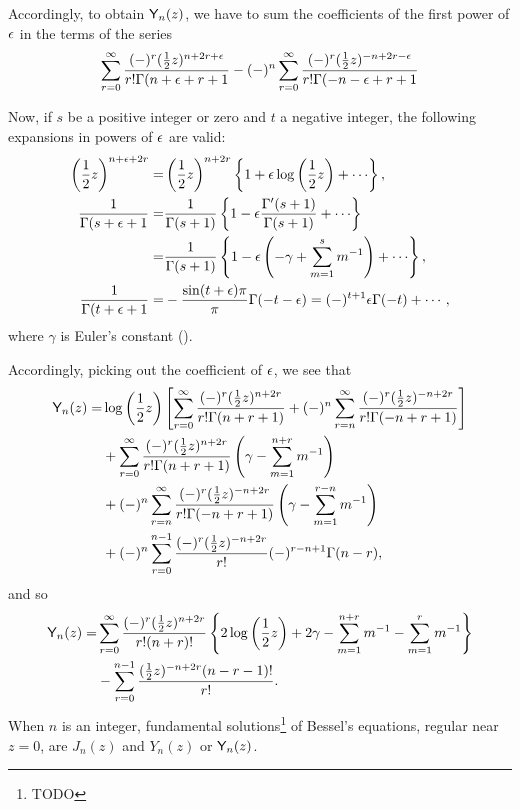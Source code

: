 \documentclass{book}
\begin{document}
    Accordingly, to obtain $\mathsf{Y}_n(z)$, we have to sum the
    coefficients of the first power of $\epsilon$ in the terms of the
    series
    $$
    \sum_{r=0}^{\infty}
    \frac{(-)^r (\frac{1}{2} z)^{n+2r+\epsilon}}{r! \Gamma(n+\epsilon+r+1}
    -
    (-)^n
    \sum_{r=0}^{\infty}
    \frac{(-)^r (\frac{1}{2} z)^{-n+2r -\epsilon}}{r! \Gamma(-n-\epsilon+r+1}
    $$

    Now, if $s$ be a positive integer or zero and $t$ a negative
    integer, the following expansions in powers of $\epsilon$ are valid:
    \begin{align*}
      \theparen{\half z}^{n+\eps+2r}
      =& \theparen{\half z}^{n+2r}
      \thebrace{1 + \eps\log\theparen{\half z} + \cdots},
      \\
      \frac{1}{\Gamma(s+\eps+1}
      =&
      \frac{1}{\Gamma(s+1)}
      \thebrace{
        1 - \eps \frac{\Gamma'(s+1)}{\Gamma(s+1)} + \cdots
      }
      \\
      =&
      \frac{1}{\Gamma(s+1)}
      \thebrace{
        1 - \eps\theparen{-\gamma + \sum_{m=1}^{s} m^{-1}} + \cdots
      },
      \\
      \frac{1}{\Gamma(t+\eps+1}
      =&
      - \frac{\sin(t+\eps)\pi}{\pi}
      \Gamma(-t-\eps)
      =
      (-)^{t+1} \eps \Gamma(-t) + \cdots,
    \end{align*}
    where $\gamma$ is Euler's constant ().

    Accordingly, picking out the coefficient of $\epsilon$, we see that
    \begin{align*}
    \mathsf{Y}_n(z)
    =&
    \log\left( \frac{1}{2} z \right)
    \left[ 
      \sum_{r=0}^{\infty}
      \frac{(-)^r (\frac{1}{2} z)^{n+2r}}{r! \Gamma(n+r+1)}
      + (-)^n \sum_{r=n}^{\infty} \frac{(-)^r (\frac{1}{2} z)^{-n+2r}}{r! \Gamma(-n+r+1)}
     \right]
    \\
    &
    + \sum_{r=0}^{\infty}
    \frac{(-)^r (\frac{1}{2} z)^{n+2r}}{r! \Gamma(n+r+1)}
    \left( \gamma - \sum_{m=1}^{n+r} m^{-1} \right)
    \\
    &
    + (-)^n
    \sum_{r=n}^{\infty}
    \frac{(-)^r (\frac{1}{2} z)^{-n+2r}}{r! \Gamma(-n+r+1)}
    \left( \gamma - \sum_{m=1}^{r-n} m^{-1} \right)
    \\
    &
    + (-)^n
    \sum_{r=0}^{n-1}
    \frac{ (-)^r (\frac{1}{2} z)^{-n+2r}}{r!}
    (-)^{r-n+1} \Gamma(n-r),
  \end{align*}
  and so
  \begin{align*}
    \mathsf{Y}_n(z)
    =&
    \sum_{r=0}^{\infty}
    \frac{(-)^r (\frac{1}{2} z)^{n+2r}}{r!(n+r)!}
    \left\{ 
      2 \log\left( \frac{1}{2} z \right)
      + 2\gamma
      - \sum_{m=1}^{n+r} m^{-1}
      - \sum_{m=1}^r m^{-1}
     \right\}
    \\
    & - \sum_{r=0}^{n-1} \frac{(\frac{1}{2} z)^{-n+2r} (n-r-1)!}{r!}.
  \end{align*}
  When $n$ is an integer, fundamental solutions\footnote{TODO} of
  Bessel's equations, regular near $z=0$, are $J_n(z)$ and $Y_n(z)$ or
  $\mathsf{Y}_n(z)$.
\end{document}
